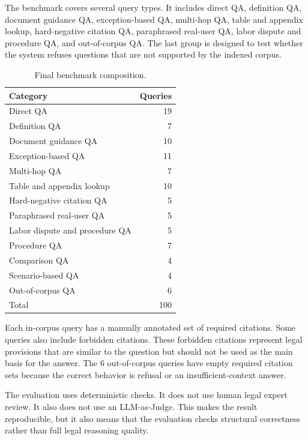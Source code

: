 The benchmark covers several query types. It includes direct QA, definition QA, document guidance QA, exception-based QA, multi-hop QA, table and appendix lookup, hard-negative citation QA, paraphrased real-user QA, labor dispute and procedure QA, and out-of-corpus QA. The last group is designed to test whether the system refuses questions that are not supported by the indexed corpus.

\begin{table}[H]
  \centering
  \caption{Final benchmark composition.}
  \label{tab:final-benchmark-composition}
  \begin{tabular}{lr}
    \toprule
    Category & Queries \\
    \midrule
    Direct QA & 19 \\
    Definition QA & 7 \\
    Document guidance QA & 10 \\
    Exception-based QA & 11 \\
    Multi-hop QA & 7 \\
    Table and appendix lookup & 10 \\
    Hard-negative citation QA & 5 \\
    Paraphrased real-user QA & 5 \\
    Labor dispute and procedure QA & 5 \\
    Procedure QA & 7 \\
    Comparison QA & 4 \\
    Scenario-based QA & 4 \\
    Out-of-corpus QA & 6 \\
    \midrule
    Total & 100 \\
    \bottomrule
  \end{tabular}
\end{table}

Each in-corpus query has a manually annotated set of required citations. Some queries also include forbidden citations. These forbidden citations represent legal provisions that are similar to the question but should not be used as the main basis for the answer. The 6 out-of-corpus queries have empty required citation sets because the correct behavior is refusal or an insufficient-context answer.

The evaluation uses deterministic checks. It does not use human legal expert review. It also does not use an LLM-as-Judge. This makes the result reproducible, but it also means that the evaluation checks structural correctness rather than full legal reasoning quality.

